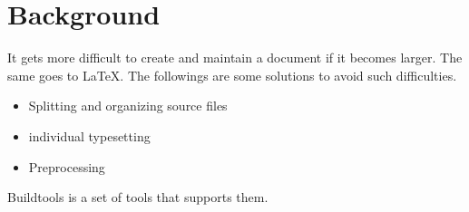 \section{Background}

It gets more difficult to create and maintain a document if it becomes
larger. The same goes to LaTeX. The followings are some solutions to
avoid such difficulties.

\begin{itemize}
\item
  Splitting and organizing source files
\item
  individual typesetting
\item
  Preprocessing
\end{itemize}

Buildtools is a set of tools that supports them.
